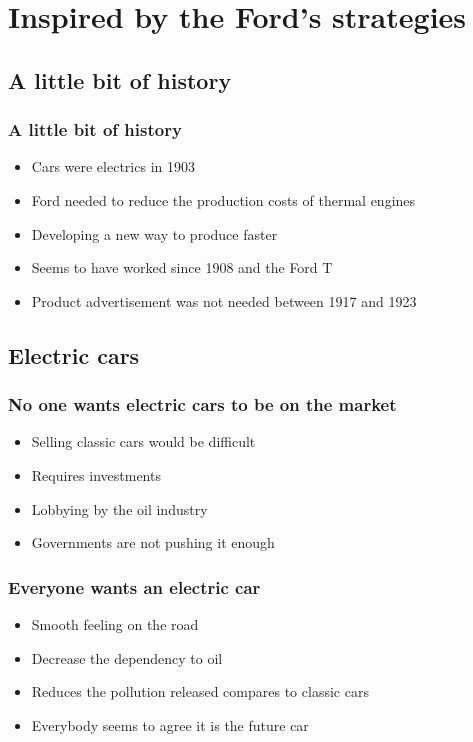     \section{Inspired by the Ford's strategies}

\subsection{A little bit of history}
\begin{frame}
\frametitle{A little bit of history}
\begin{itemize}
    \itemsep1em
    \item Cars were electrics in 1903
    \item Ford needed to reduce the production costs of thermal engines
    \item Developing a new way to produce faster
    \item Seems to have worked since 1908 and the Ford T
    \item Product advertisement was not needed between 1917 and 1923
\end{itemize}
\end{frame}

\subsection{Electric cars}
\begin{frame}
\frametitle{No one wants electric cars to be on the market}
\begin{itemize}
    \itemsep1.5em
    \item Selling classic cars would be difficult
    \item Requires investments
    \item Lobbying by the oil industry
    \item Governments are not pushing it enough
\end{itemize}
\end{frame}

\begin{frame}
\frametitle{Everyone wants an electric car}
\begin{itemize}
    \itemsep1.5em
    \item Smooth feeling on the road
    \item Decrease the dependency to oil
    \item Reduces the pollution released compares to classic cars
    \item Everybody seems to agree it is the future car
\end{itemize}
\end{frame}

